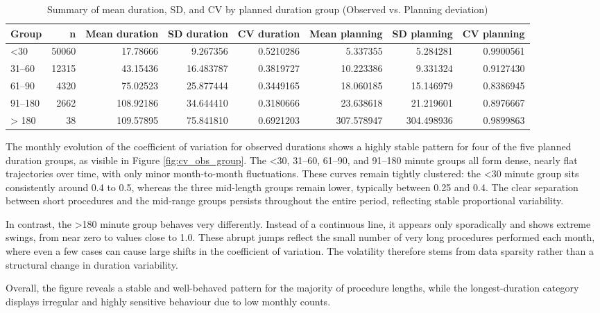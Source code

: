 \documentclass[
]{article}
\begin{document}
\begin{table}

\caption{\label{tab:cv group}Summary of mean duration, SD, and CV by planned duration group (Observed vs. Planning deviation) \label{tab:cv_group}}
\centering
\begin{tabular}[t]{lrrrrrrr}
\toprule
Group & n & Mean duration & SD duration & CV duration & Mean planning & SD planning & CV planning\\
\midrule
<30 & 50060 & 17.78666 & 9.267356 & 0.5210286 & 5.337355 & 5.284281 & 0.9900561\\
31–60 & 12315 & 43.15436 & 16.483787 & 0.3819727 & 10.223386 & 9.331324 & 0.9127430\\
61–90 & 4320 & 75.02523 & 25.877444 & 0.3449165 & 18.060185 & 15.146979 & 0.8386945\\
91–180 & 2662 & 108.92186 & 34.644410 & 0.3180666 & 23.638618 & 21.219601 & 0.8976667\\
> 180 & 38 & 109.57895 & 75.841810 & 0.6921203 & 307.578947 & 304.498936 & 0.9899863\\
\bottomrule
\end{tabular}
\end{table}

The monthly evolution of the coefficient of variation for observed
durations shows a highly stable pattern for four of the five planned
duration groups, as visible in Figure \ref{fig:cv_obs_group}. The
\textless30, 31--60, 61--90, and 91--180 minute groups all form dense,
nearly flat trajectories over time, with only minor month-to-month
fluctuations. These curves remain tightly clustered: the \textless30
minute group sits consistently around 0.4 to 0.5, whereas the three
mid-length groups remain lower, typically between 0.25 and 0.4. The
clear separation between short procedures and the mid-range groups
persists throughout the entire period, reflecting stable proportional
variability.

In contrast, the \textgreater180 minute group behaves very differently.
Instead of a continuous line, it appears only sporadically and shows
extreme swings, from near zero to values close to 1.0. These abrupt
jumps reflect the small number of very long procedures performed each
month, where even a few cases can cause large shifts in the coefficient
of variation. The volatility therefore stems from data sparsity rather
than a structural change in duration variability.

Overall, the figure reveals a stable and well-behaved pattern for the
majority of procedure lengths, while the longest-duration category
displays irregular and highly sensitive behaviour due to low monthly
counts.
\end{document}
